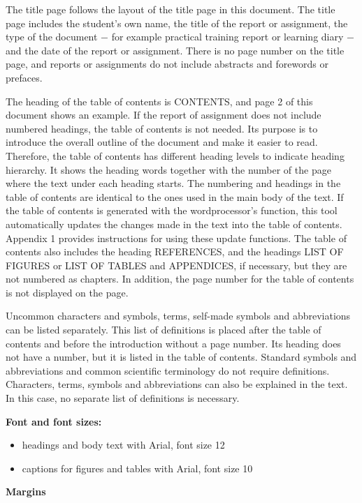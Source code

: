 \documentclass[12pt]{article}
\begin{document}
The title page follows the layout of the title page in this document. The title page includes the student’s own name, the title of the report or assignment, the type of the document − for example practical training report or learning diary − and the date of the report or assignment. There is no page number on the title page, and reports or assignments 
do not include abstracts and forewords or prefaces. 

The heading of the table of contents is CONTENTS, and page 2 of this document shows an example. If the report of assignment does not include numbered headings, the table of contents is not needed. Its purpose is to introduce the overall outline of the document and make it easier to read. Therefore, the table of contents has different heading levels to indicate heading hierarchy. It shows the heading words together with the number of the page where the text under each heading starts. The numbering and headings in the table of contents are identical to the ones used in the main body of the text. If the table of contents is generated with the wordprocessor’s function, this tool automatically updates the changes made in the text into the table of contents. Appendix 1 provides instructions for using these update functions. The table of contents also includes the heading REFERENCES, and the headings LIST OF FIGURES or LIST OF TABLES and APPENDICES, if necessary, but they are not numbered as chapters. In addition, the page number for the table of contents is not displayed on the page.

Uncommon characters and symbols, terms, self-made symbols and abbreviations can be listed separately. This list of definitions is placed after the table of contents and before the introduction without a page number. Its heading does not have a number, but it is listed in the table of contents. Standard symbols and abbreviations and common scientific terminology do not require definitions. Characters, terms, symbols and abbreviations can also be explained in the text. In this case, no separate list of definitions is necessary.


\textbf{Font and font sizes:}

\begin{itemize}
	\item{headings and body text with Arial, font size 12}
	\item{captions for figures and tables with Arial, font size 10}
\end{itemize}

\textbf{Margins}
\end{document}
